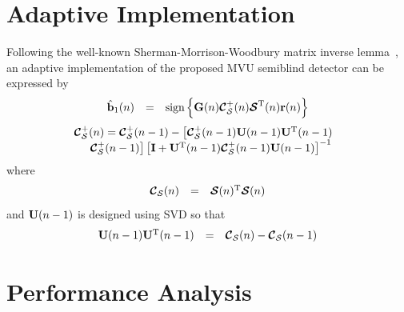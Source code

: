 \documentclass[a4paper,10pt,fleqn, twocolumn]{IEEETran}
\newcommand{\br}{{\mathbf r}}
\newcommand{\bb}{{\bf b}}
\newcommand{\bG}{{\bf G}}
\newcommand{\bI}{{\bf I}}
\newcommand{\bU}{{\bf U}}
\newcommand{\bcC}{{\mbox {\boldmath ${\cal C}$}}}
\newcommand{\bcS}{{\mbox {\boldmath ${\cal S}$}}}
\begin{document}
\section{Adaptive Implementation}
Following the well-known Sherman-Morrison-Woodbury matrix inverse
lemma~\cite{Golu96}, an adaptive implementation of  the proposed
MVU semiblind detector can be expressed by
\begin{equation}\hspace{-0.0in}
\begin{array}{rcl}
\hat{\bb}_1(n)&=&\mbox{sign}\left\{\bG(n)\bcC_{\cal
S}^{+}(n)\bcS^{\rm T}(n)\br(n)\right\}
\end{array}
\end{equation}
\begin{equation}\hspace{-0.1in}
\begin{array}{l}
\bcC_{\cal S}^{+}(n)=\bcC_{\cal S}^{+}(n-1)-\bigl[\bcC_{\cal
S}^{+}(n-1)\bU(n-1)\bU^{\rm T}(n-1)\\
\hspace{0.2in}\bcC_{\cal S}^{+}(n-1)\bigr]\left[\bI+\bU^{\rm
T}(n-1)\bcC_{\cal S}^{+}(n-1)\bU(n-1)\right]^{-1}
\end{array}\label{adaptiveLS}
\end{equation}
\noindent where
\begin{equation}\hspace{-0.0in}
\begin{array}{rcl}
\bcC_{\cal S}(n)&=&\bcS(n)^{\rm T}\bcS(n)
\end{array}
\end{equation}
 \noindent and $\bU(n-1)$ is designed using SVD so that
\begin{equation}\hspace{-0.00in}
\begin{array}{rcl}
\bU(n-1)\bU^{\rm T}(n-1)&=&\bcC_{\cal S}(n)-\bcC_{\cal S}(n-1)
\end{array}
\end{equation}

\section{Performance Analysis}
\end{document}
